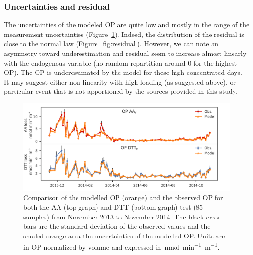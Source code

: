 \documentclass[acp, manuscript]{copernicus}
\begin{document}
\subsubsection{Uncertainties and residual}\label{uncertainties-and-residual}

The uncertainties of the modeled OP are quite low and mostly in the range of the
measurement uncertainties (Figure~\ref{fig:TSobsvsmodel}). Indeed, the
distribution of the residual is close to the normal law
(Figure~\ref{fig:residual}).  However, we can note an asymmetry toward
underestimation and residual seem to increase almost linearly with the
endogenous variable (no random repartition around 0 for the highest OP). The OP
is underestimated by the model for these high concentrated days. It may suggest
either non-linearity with high loading (as suggested above), or particular event
that is not apportioned by the sources provided in this study.

\begin{figure}[h]
    \centering
    \includegraphics[width=\textwidth]{figures/fig04}
    \caption{Comparison of the modelled OP (orange) and the observed OP for both
        the AA (top graph) and DTT (bottom graph) test (85 samples) from
        November 2013 to November 2014. The black error bars are the standard
        deviation of the observed values and the shaded orange area the
    uncertainties of the modelled OP.  Units are in OP normalized by volume
    and expressed in~\unit{nmol~min^{-1}~m^{-1}}.}
    \label{fig:TSobsvsmodel}
\end{figure}
\end{document}
